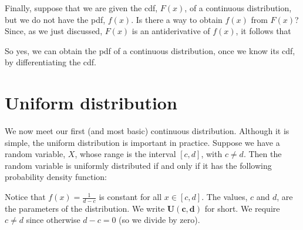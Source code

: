 \noindent Finally, suppose that we are given the cdf, $F(x)$, of a continuous distribution, but we do not have the pdf, $f(x)$. Is there a way to obtain $f(x)$ from $F(x)$? \\

\noindent Since, as we just discussed, $F(x)$ is an antiderivative of $f(x)$, it follows that

  	\bigskip
	
	\hfil{}
	\bigskip
	\bigskip

\noindent So yes, we can obtain the pdf of a continuous distribution, once we know its cdf, by differentiating the cdf.

\section{Uniform distribution}
We now meet our first (and most basic) continuous distribution. Although it is simple, the uniform distribution is important in practice. Suppose we have a random variable, $X$, whose range is the interval $[c,d]$, with $c \neq d$. Then the random variable is uniformly distributed if and only if it has the following probability density function: \label{U(a,b)}

  	\bigskip
	
	\hfil{}
	\bigskip
	\bigskip

\noindent Notice that $f(x) = \frac{1}{d-c}$ is constant for all $x \in [c,d]$. The values, $c$ and $d$, are the parameters of the distribution. We write \textbf{U$\boldsymbol{(c,d)}$} for short. We require $c \neq d$ since otherwise $d-c = 0$ (so we divide by zero). \\


